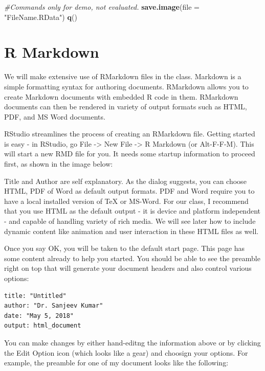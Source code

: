\documentclass[]{krantz}
\makeatletter
\newenvironment{Shaded}{\begin{snugshade}}{\end{snugshade}}
\newcommand{\KeywordTok}[1]{\textcolor[rgb]{0.27,0.27,0.27}{\textbf{#1}}}
\newcommand{\DataTypeTok}[1]{\textcolor[rgb]{0.27,0.27,0.27}{#1}}
\newcommand{\StringTok}[1]{\textcolor[rgb]{0.5,0.5,0.5}{#1}}
\newcommand{\CommentTok}[1]{\textcolor[rgb]{0.37,0.37,0.37}{\textit{#1}}}
\newcommand{\NormalTok}[1]{#1}
\newenvironment{kframe}{%
\medskip{}
\setlength{\fboxsep}{.8em}
 \def\at@end@of@kframe{}%
 \ifinner\ifhmode%
  \def\at@end@of@kframe{\end{minipage}}%
  \begin{minipage}{\columnwidth}%
 \fi\fi%
 \def\FrameCommand##1{\hskip\@totalleftmargin \hskip-\fboxsep
 \colorbox{shadecolor}{##1}\hskip-\fboxsep
     \hskip-\linewidth \hskip-\@totalleftmargin \hskip\columnwidth}%
 \MakeFramed {\advance\hsize-\width
   \@totalleftmargin\z@ \linewidth\hsize
   \@setminipage}}%
 {\par\unskip\endMakeFramed%
 \at@end@of@kframe}
\renewenvironment{Shaded}{\begin{kframe}}{\end{kframe}}
\makeatother
\begin{document}
\begin{Shaded}
\begin{Highlighting}[]
\CommentTok{#Commands only for demo, not evaluated.}
\KeywordTok{save.image}\NormalTok{(}\DataTypeTok{file =} \StringTok{"FileName.RData"}\NormalTok{)}
\KeywordTok{q}\NormalTok{()}
\end{Highlighting}
\end{Shaded}

\chapter{R Markdown}\label{r-markdown-1}

We will make extensive use of RMarkdown files in the class. Markdown is
a simple formatting syntax for authoring documents. RMarkdown allows you
to create Markdown documents with embedded R code in them. RMarkdown
documents can then be rendered in variety of output formats such as
HTML, PDF, and MS Word documents.

RStudio streamlines the process of creating an RMarkdown file. Getting
started is easy - in RStudio, go File -\textgreater{} New File
-\textgreater{} R Markdown (or Alt-F-F-M). This will start a new RMD
file for you. It needs some startup information to proceed first, as
shown in the image below:

Title and Author are self explanatory. As the dialog suggests, you can
choose HTML, PDF of Word as default output formats. PDF and Word require
you to have a local installed version of TeX or MS-Word. For our class,
I recommend that you use HTML as the default output - it is device and
platform independent - and capable of handling variety of rich media. We
will see later how to include dynamic content like animation and user
interaction in these HTML files as well.

Once you say OK, you will be taken to the default start page. This page
has some content already to help you started. You should be able to see
the preamble right on top that will generate your document headers and
also control various options:

\begin{verbatim}
title: "Untitled"
author: "Dr. Sanjeev Kumar"
date: "May 5, 2018"
output: html_document
\end{verbatim}

You can make changes by either hand-editng the information above or by
clicking the Edit Option icon (which looks like a gear) and choosign
your options. For example, the preamble for one of my document looks
like the following:
\end{document}
